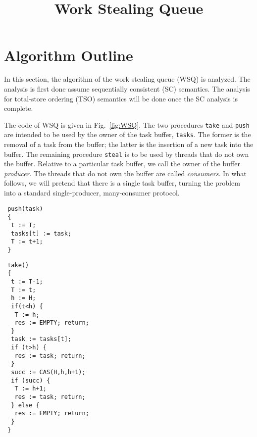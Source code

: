 \documentclass[a4paper]{article}
\title{Work Stealing Queue}
\begin{document}
\maketitle

\noindent 
\section{Algorithm Outline}
In this section, the algorithm of the work stealing queue (WSQ) is analyzed.
The analysis is first done assume sequentially consistent (SC) semantics.
The analysis for total-store ordering (TSO) semantics will be done once the SC analysis is complete.

The code of WSQ is given in Fig.~\ref{fig:WSQ}. 
The two procedures {\tt take} and {\tt push} are intended to be used by the owner of the task buffer, {\tt tasks}.
The former is the removal of a task from the buffer; the latter is the insertion of a new task into the buffer.
The remaining procedure {\tt steal} is to be used by threads that do not own the buffer.
Relative to a particular task buffer, we call the owner of the buffer {\em producer}. 
The threads that do not own the buffer are called {\em consumers}.
In what follows, we will pretend that there is a single task buffer, turning the problem into a standard single-producer, many-consumer protocol.

\begin{lrbox}{\producerpushbox}%
\begin{minipage}[t]{.45\linewidth}%
\vspace*{\fill}
\begin{lstlisting}
 push(task)
 {
  t := T;
  tasks[t] := task;
  T := t+1;
 }
\end{lstlisting}%
\end{minipage}%
\end{lrbox}

\begin{lrbox}{\producertakebox}%
\begin{minipage}[t]{.45\linewidth}%
\begin{lstlisting}
 take()
 {
  t := T-1;
  T := t;
  h := H;
  if(t<h) {
   T := h; 
   res := EMPTY; return;
  }
  task := tasks[t];
  if (t>h) {
   res := task; return;
  }
  succ := CAS(H,h,h+1);
  if (succ) {
   T := h+1;
   res := task; return;
  } else {
   res := EMPTY; return;
  }
 }
\end{lstlisting}%
\end{minipage}%
\end{lrbox}%
\end{document}
